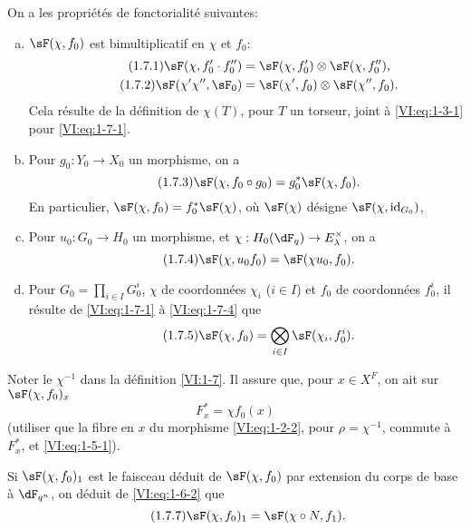 On a les propriétés de fonctorialité suivantes:
\begin{enumerate}[a)]
  \item $\sF(\chi,f_0)$ est bimultiplicatif en $\chi$ et $f_0$: 
    \begin{align*}\tag{1.7.1}\label{VI:eq:1-7-1}
      \sF(\chi,f_0'\cdot f_0'') &= \sF(\chi,f_0')\otimes \sF(\chi,f_0'') \text{,} \\
      \tag{1.7.2}\label{VI:eq:1-7-2}
      \sF(\chi'\chi'',\sF_0) &= \sF(\chi',f_0)\otimes \sF(\chi'',f_0) \text{.}
    \end{align*}
    Cela résulte de la définition de $\chi(T)$, pour $T$ un torseur, joint 
    à \eqref{VI:eq:1-3-1} pour \eqref{VI:eq:1-7-1}. 
  \item Pour $g_0:Y_0\to X_0$ un morphisme, on a 
    \begin{equation*}\tag{1.7.3}\label{VI:eq:1-7-3}
      \sF(\chi,f_0\circ g_0) = g_0^\ast \sF(\chi,f_0) \text{.}
    \end{equation*}
    En particulier, $\sF(\chi,f_0) = f_0^\ast \sF(\chi)$, où $\sF(\chi)$ 
    désigne $\sF(\chi,\operatorname{id}_{G_0})$, 
  \item Pour $u_0:G_0\to H_0$ un morphisme, et 
    $\chi:H_0(\dF_q) \to E_\lambda^\times$, on a 
    \begin{equation*}\tag{1.7.4}\label{VI:eq:1-7-4}
      \sF(\chi,u_0 f_0) = \sF(\chi u_0,f_0) \text{.}
    \end{equation*}
  \item Pour $G_0=\prod_{i\in I} G_0^i$, $\chi$ de coordonnées $\chi_i$ 
    ($i\in I$) et $f_0$ de coordonnées $f_0^i$, il résulte de 
    \eqref{VI:eq:1-7-1} à \eqref{VI:eq:1-7-4} que 
    \begin{equation*}\tag{1.7.5}\label{VI:eq:1-7-5}
      \sF(\chi,f_0) = \bigotimes_{i\in I} \sF(\chi_i,f_0^i) \text{.}
    \end{equation*}    
\end{enumerate}

Noter le $\chi^{-1}$ dans la définition \ref{VI:1-7}. Il assure que, pour 
$x\in X^F$, on ait sur $\sF(\chi,f_0)_x$ 
\begin{equation*}\tag{1.7.6}\label{VI:eq:1-7-6}
  F_x^\ast = \chi f_0(x)
\end{equation*}
(utiliser que la fibre en $x$ du morphisme \eqref{VI:eq:1-2-2}, pour 
$\rho=\chi^{-1}$, commute à $F_x^\ast$, et \eqref{VI:eq:1-5-1}). 

Si $\sF(\chi,f_0)_1$ est le faisceau déduit de $\sF(\chi,f_0)$ par extension 
du corps de base à $\dF_{q^n}$, on déduit de \eqref{VI:eq:1-6-2} que 
\begin{equation*}\tag{1.7.7}\label{VI:eq:1-7-7}
  \sF(\chi,f_0)_1 = \sF(\chi\circ N,f_1) \text{.}
\end{equation*}





